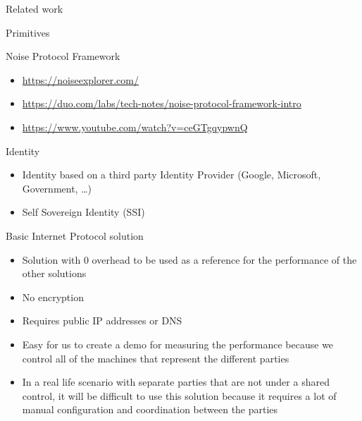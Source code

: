 \begin{frame}[fragile]{Related work}
\begin{block}{Primitives}
\begin{block}{Noise Protocol Framework}
\begin{itemize}
\begin{itemize}
    \begin{itemize}
    \tightlist
    \item
      Low-level primitives - AES, ChaCha20.
    \item
      Usefully combined primitives - AES-OCB, NaCl secretbox\ldots{}
    \item
      High-level protocols - TLS, Noise.
    \item
      (sometimes) crypto spoken over the encrypted protocols, often for
      E2E crypto e.g.~GPG over SMTPS, or CloudFlare blinded CAPTCHA
      tokens over HTTPS
    \end{itemize}
  \item
    \url{https://noiseexplorer.com/}
  \item
    \url{https://duo.com/labs/tech-notes/noise-protocol-framework-intro}
  \item
    \url{https://www.youtube.com/watch?v=ceGTgqypwnQ}
  \end{itemize}
\end{itemize}
\end{block}

\begin{block}{Identity}
\protect\hypertarget{identity}{}
\begin{itemize}
\tightlist
\item
  Identity based on a third party Identity Provider (Google, Microsoft,
  Government, \ldots)
\item
  Self Sovereign Identity (SSI)
\end{itemize}
\end{block}
\end{block}

\begin{block}{Basic Internet Protocol solution}
\protect\hypertarget{basic-internet-protocol-solution}{}
\begin{itemize}
\tightlist
\item
  Solution with 0 overhead to be used as a reference for the performance
  of the other solutions
\item
  No encryption
\item
  Requires public IP addresses or DNS
\item
  Easy for us to create a demo for measuring the performance because we
  control all of the machines that represent the different parties
\item
  In a real life scenario with separate parties that are not under a
  shared control, it will be difficult to use this solution because it
  requires a lot of manual configuration and coordination between the
  parties
\end{itemize}
\end{block}


\end{frame}
